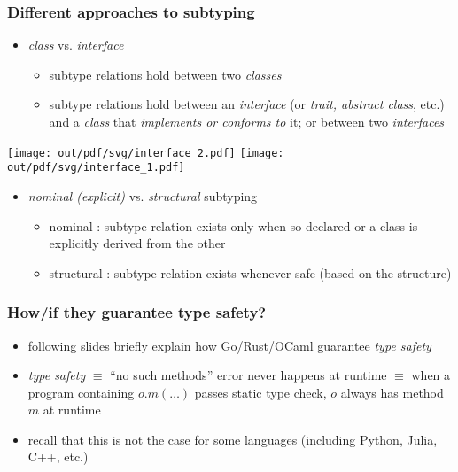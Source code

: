 \documentclass[12pt,dvipdfmx]{beamer}
\newcommand{\ao}[1]{{\color{blue}#1}}
\begin{document}
\begin{frame}
  \frametitle{Different approaches to subtyping}

  \begin{itemize}
  \item \ao{\it class} vs. \ao{\it interface}
    \begin{itemize}
    \item subtype relations hold between two \ao{\it classes}
    \item subtype relations hold between an \ao{\it interface} (or {\it trait, abstract class}, etc.) and a \ao{\it class} that {\it implements or conforms to} it; or between two \ao{\it interfaces}
    \end{itemize}
  \end{itemize}

  \begin{center}
    \texttt{[image: out/pdf/svg/interface\_2.pdf]}
    \texttt{[image: out/pdf/svg/interface\_1.pdf]}
  \end{center}

  \begin{itemize}
  \item \ao{\it nominal (explicit)} vs. \ao{\it structural} subtyping
    \begin{itemize}
    \item nominal : subtype relation exists only when so declared or a class is explicitly derived from the other
    \item structural : subtype relation exists whenever safe
      (based on the structure)
    \end{itemize}
  \end{itemize}
\end{frame}

\begin{frame}
  \frametitle{How/if they guarantee type safety?}
  \begin{itemize}
  \item following slides briefly explain how Go/Rust/OCaml guarantee \ao{\it type safety}
  \item \ao{\it type safety} $\equiv$ ``no such methods'' error never happens at runtime
    $\equiv$ when a program containing $o.m(\ldots)$ passes static type check,
    $o$ always has method $m$ at runtime
  \item recall that this is not the case for some languages (including Python, Julia, C++, etc.)
  \end{itemize}
\end{frame}
\end{document}
